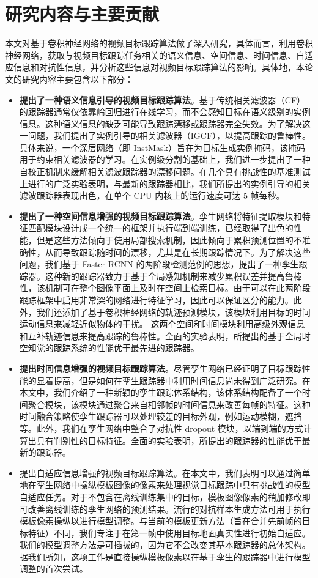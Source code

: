 \section{研究内容与主要贡献}
本文对基于卷积神经网络的视频目标跟踪算法做了深入研究，具体而言，利用卷积神经网络，获取与视频目标跟踪任务相关的语义信息、空间信息、时间信息、自适应信息和对抗性信息，并分析这些信息对视频目标跟踪算法的影响。具体地，本论文的研究内容主要包含以下部分：
\begin{itemize}
\item \textbf{提出了一种语义信息引导的视频目标跟踪算法}。基于传统相关滤波器（CF）的跟踪器通常仅依靠岭回归进行在线学习，而不会感知目标在语义级别的实例信息。这种语义信息的缺乏可能导致跟踪漂移或跟踪器完全失效。为了解决这一问题，我们提出了实例引导的相关滤波器（IGCF），以提高跟踪的鲁棒性。具体来说，一个深层网络（即 InstMask）旨在为目标生成实例掩码，该掩码用于约束相关滤波器的学习。在实例级分割的基础上，我们进一步提出了一种自校正机制来缓解相关滤波跟踪器的漂移问题。在几个具有挑战性的基准测试上进行的广泛实验表明，与最新的跟踪器相比，我们所提出的实例引导的相关滤波跟踪器表现出色，在单个 CPU 内核上的运行速度可达 5 帧每秒。
\item \textbf{提出了一种空间信息增强的视频目标跟踪算法}。孪生网络将特征提取模块和特征匹配模块设计成一个统一的框架并执行端到端训练，已经取得了出色的性能，但是这些方法倾向于使用局部搜索机制，因此倾向于累积预测位置的不准确性，从而导致跟踪随时间的漂移，尤其是在长期跟踪情况下。为了解决这些问题，我们基于 Faster RCNN 的两阶段检测范例的思想，提出了一种孪生跟踪器。这种新的跟踪器致力于基于全局感知机制来减少累积误差并提高鲁棒性，该机制可在整个图像平面上及时在空间上检索目标。由于可以在此两阶段跟踪框架中启用非常深的网络进行特征学习，因此可以保证区分的能力。此外，我们还添加了基于卷积神经网络的轨迹预测模块，该模块利用目标的时间运动信息来减轻近似物体的干扰。
这两个空间和时间模块利用高级外观信息和互补轨迹信息来提高跟踪的鲁棒性。全面的实验表明，所提出的基于全局时空知觉的跟踪系统的性能优于最先进的跟踪器。
\item \textbf{提出时间信息增强的视频目标跟踪算法}。尽管孪生网络已经证明了目标跟踪性能的显着提高，但是如何在孪生跟踪器中利用时间信息尚未得到广泛研究。在本文中，我们介绍了一种新颖的孪生跟踪体系结构，该体系结构配备了一个时间聚合模块，该模块通过聚合来自相邻帧的时间信息来改善每帧的特征。这种时间融合策略使孪生跟踪器可以处理较差的目标外观，例如运动模糊，遮挡等。此外，我们在孪生网络中整合了对抗性 dropout 模块，以端到端的方式计算出具有判别性的目标特征。全面的实验表明，所提出的跟踪器的性能优于最新的跟踪器。
\item 提出自适应信息增强的视频目标跟踪算法。在本文中，我们表明可以通过简单地在孪生网络中操纵模板图像的像素来处理视觉目标跟踪中具有挑战性的模型自适应任务。对于不包含在离线训练集中的目标，模板图像像素的稍加修改即可改善离线训练的孪生网络的预测结果。流行的对抗样本生成方法可用于执行模板像素操纵以进行模型调整。与当前的模板更新方法（旨在合并先前帧的目标特征）不同，我们专注于在第一帧中使用目标地面真实性进行初始自适应。我们的模型调整方法是可插拔的，因为它不会改变其基本跟踪器的总体架构。据我们所知，这项工作是直接操纵模板像素以在基于孪生的跟踪器中进行模型调整的首次尝试。

\end{itemize}
